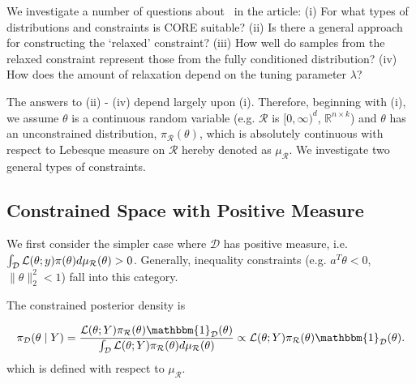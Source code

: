 \documentclass[10pt,fleqn]{article} \pdfoutput=1
\DeclareMathOperator{\1}{\mathbbm{1}} \DeclareMathOperator{\bigO}{\mc O}
\begin{document}
We investigate a number of questions about \core\, in the article:  (i) For
what types of distributions and constraints is CORE suitable? (ii) Is there
a general approach for constructing the `relaxed' constraint? (iii) How
well do samples from the relaxed constraint represent those from the fully
conditioned distribution?  (iv) How does the amount of relaxation depend on the
tuning parameter $\lambda$?

The answers to (ii) - (iv) depend largely upon (i).  Therefore, beginning
with (i), we assume $\theta$ is a continuous random variable (e.g.
$\mathcal{R}$ is $[0,\infty)^d$, $\mathbb{R}^{n\times k}$)
and $\theta$ has an unconstrained distribution, $\pi_\mathcal{R}(\theta)$,
which is absolutely continuous with respect to Lebesque measure on
$\mathcal{R}$ hereby denoted as $\mu_\mathcal{R}$.  We investigate two
general types of constraints.

%


\subsection{Constrained Space with Positive Measure}
\label{SEC:Positive_measure_methods}

We first consider the simpler case where $\mathcal{D}$ has positive measure,  i.e.
$\int_\mathcal{D} {\mathcal{L}}(\theta;y)\pi(\theta)d\mu_\mathcal{R}(\theta) >0$.
Generally, inequality constraints (e.g.  $a^T\theta
	< 0$, $\|\theta\|_2^2 < 1$) fall into this category.

The constrained posterior density is

$$\pi_\mathcal{D}(\theta\mid Y) = \frac{\mathcal{L}(\theta; Y)
		\pi_\mathcal{R}(\theta)\mathbbm{1}_\mathcal{D}(\theta)}{\int_\mathcal{D}
		\mathcal{L}(\theta; Y)
		\pi_\mathcal{R}(\theta)d\mu_\mathcal{R}(\theta)}\propto \mathcal{L}(\theta;
	Y) \pi_\mathcal{R}(\theta)\mathbbm{1}_\mathcal{D}(\theta). $$
which is defined with respect to $\mu_\mathcal{R}$.
\end{document}
